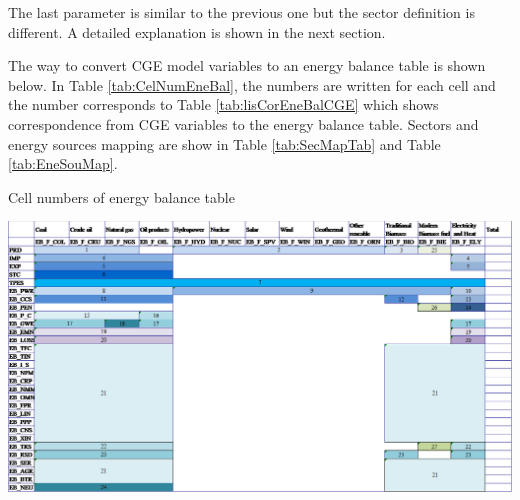 \documentclass[10pt,a4paper,titlepage,dvipdfmx]{book}
\begin{document}
The last parameter is similar to the previous one but the sector definition is different. A detailed explanation is shown in the next section.

The way to convert CGE model variables to an energy balance table is shown below. In Table \ref{tab:CelNumEneBal}, the numbers are written for each cell and the number corresponds to Table \ref{tab:lisCorEneBalCGE} which shows correspondence from CGE variables to the energy balance table. Sectors and energy sources mapping are show in Table \ref{tab:SecMapTab} and Table \ref{tab:EneSouMap}.


\begin{table}
\caption{\label{tab:CelNumEneBal}Cell numbers of energy balance table}\includegraphics[width=1\textwidth]{fig/image15.png}
\end{table}
\end{document}
